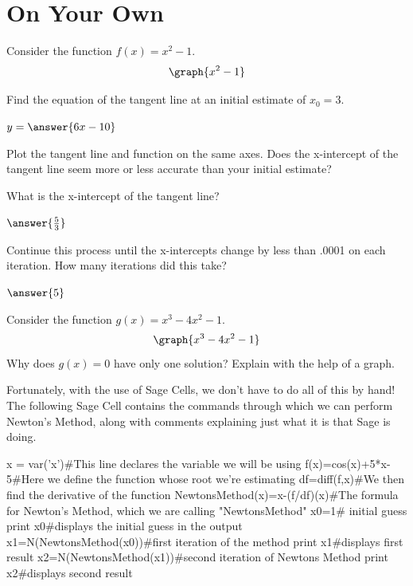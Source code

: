\documentclass{ximera}
\begin{document}
\section{On Your Own}
\begin{question}
Consider the function $f(x) = x^2-1$.
\[
\graph{x^2-1}
\]

Find the equation of the tangent line at an initial estimate of $x_0=3$.

$y = \answer{6x-10}$

Plot the tangent line and function on the same axes. Does the x-intercept of the tangent line seem more or less accurate than your initial estimate?

\begin{multipleChoice}
\end{multipleChoice}

What is the x-intercept of the tangent line?

$\answer{\frac{5}{3}}$
\begin{onlineOnly}
\begin{sageCell}

\end{sageCell}
\end{onlineOnly}
Continue this process until the x-intercepts change by less than .0001 on each iteration. How many iterations did this take?

$\answer{5}$
\end{question}
\begin{question}
Consider the function $g(x) = x^3-4x^2-1$.
\[
\graph{x^3-4x^2-1}
\]
Why does $g(x)=0$ have only one solution? Explain with the help of a graph.

\begin{freeResponse}
\end{freeResponse}
\end{question}

Fortunately, with the use of Sage Cells, we don't have to do all of this by hand! The following Sage Cell contains the commands through which we can perform Newton's Method, along with comments explaining just what it is that Sage is doing.

\begin{onlineOnly}
\begin{sageCell}
x = var('x')#This line declares the variable we will be using
f(x)=cos(x)+5*x-5#Here we define the function whose root we're estimating
df=diff(f,x)#We then find the derivative of the function
NewtonsMethod(x)=x-(f/df)(x)#The formula for Newton's Method, which we are calling "NewtonsMethod"
x0=1# initial guess
print x0#displays the initial guess in the output
x1=N(NewtonsMethod(x0))#first iteration of the method
print x1#displays first result
x2=N(NewtonsMethod(x1))#second iteration of Newtons Method
print x2#displays second result
\end{sageCell}
\end{onlineOnly}
\end{document}

